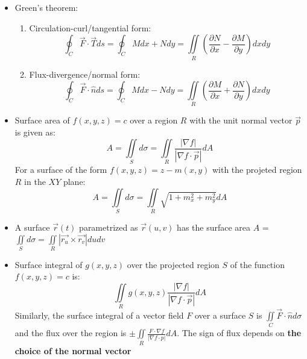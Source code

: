 \documentclass[a4paper]{article}
\begin{document}
\begin{itemize}
    \item Green's theorem: 
    \begin{enumerate}
        \item Circulation-curl/tangential form:
        \begin{equation*}
            \oint_{C}\overrightarrow{F}\cdot\overrightarrow{T}ds = \oint_{C}Mdx+Ndy = \iint\limits_R\left(\frac{\partial N}{\partial x}-\frac{\partial M}{\partial y}\right)dxdy
        \end{equation*}
        \item Flux-divergence/normal form:
        \begin{equation*}
             \oint_{C}\overrightarrow{F}\cdot\hat{n}ds = \oint_{C}Mdx-Ndy = \iint\limits_R\left(\frac{\partial M}{\partial x}+\frac{\partial N}{\partial y}\right)dxdy
        \end{equation*}
    \end{enumerate}
    \item Surface area of $f(x,y,z)=c$ over a region $R$ with the unit normal vector $\vec{p}$ is given as:
        \begin{equation*}
            A = \iint\limits_Sd\sigma = \iint\limits_R\frac{|\nabla f|}{|\nabla f\cdot\vec{p}|}dA
        \end{equation*}
    For a surface of the form $f(x,y,z) = z-m(x,y)$ with the projeted region $R$ in the $XY$ plane:
    \begin{equation*}
        A = \iint\limits_Sd\sigma = \iint\limits_R\sqrt{1+m_x^2+m_y^2}dA
    \end{equation*}
    
    \item A surface $\vec{r}(t)$ parametrized as $\vec{r}(u,v)$ has the surface area $A$ = $\iint\limits_Sd\sigma=\iint\limits_R|\vec{r_u}\times\vec{r_v}|dudv$
    
    \item Surface integral of $g(x,y,z)$ over the projected region $S$ of the function $f(x,y,z)=c$ is:
    \begin{equation*}
        \iint\limits_R g(x,y,z)\frac{|\nabla f|}{|\nabla f\cdot\vec{p}|}dA
    \end{equation*}
    Similarly, the surface integral of a vector field $F$ over a surface $S$ is
    $\iint\limits_C\overrightarrow{F}\cdot\hat{n}d\sigma$ and the flux over the region is $\pm\iint\limits_R\frac{F\cdot\nabla f}{|\nabla f\cdot p|}dA$. The sign of flux depends on \textbf{the choice of the normal vector}
    

\end{itemize}
\end{document}
